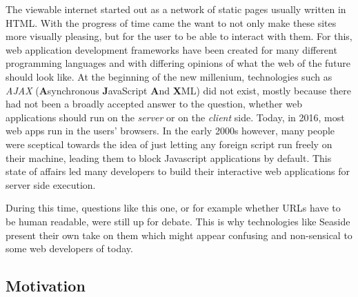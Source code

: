 \documentclass[a4paper,12pt,pagesize,headsepline,oribibl,titlepage]{scrartcl}
\begin{document}
The viewable internet started out as a network of static pages usually written in HTML. With the progress of time came the want to not only make these sites more visually pleasing, but for the user to be able to interact with them. For this, web application development frameworks have been created for many different programming languages and with differing opinions of what the web of the future should look like. At the beginning of the new millenium, technologies such as \emph{AJAX} (\textbf{A}synchronous \textbf{J}avaScript \textbf{A}nd \textbf{X}ML) did not exist, mostly because there had not been a broadly accepted answer to the question, whether web applications should run on the \emph{server} or on the \emph{client} side. Today, in 2016, most web apps run in the users' browsers. In the early 2000s however, many people were sceptical towards the idea of just letting any foreign script run freely on their machine, leading them to block Javascript applications by default. This state of affairs led many developers to build their interactive web applications for server side execution. 

During this time, questions like this one, or for example whether URLs have to be human readable, were still up for debate. This is why technologies like Seaside present their own take on them which might appear confusing and non-sensical to some web developers of today. 


\subsection{Motivation}
\label{sec:motivation} 
\medskip

\bigskip
\end{document}
